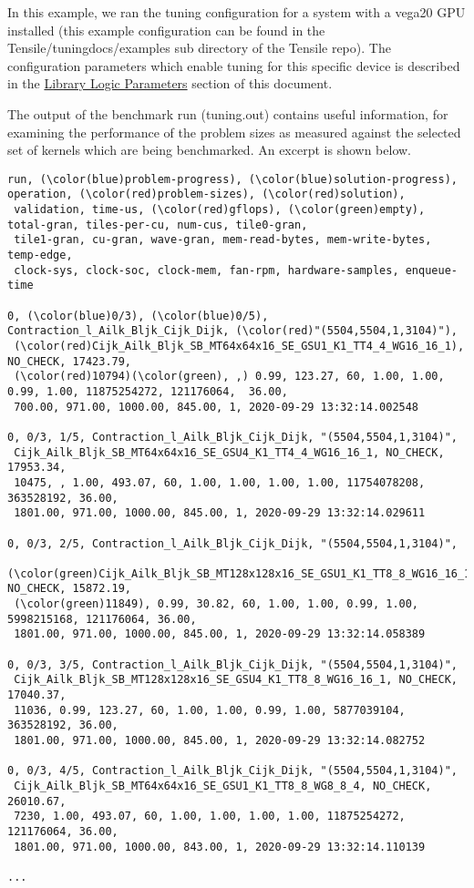 \documentclass[]{article}
\begin{document}
In this example, we ran the tuning configuration for a system with a vega20 GPU installed (this example configuration can be found in the Tensile/tuning\textunderscore docs/examples sub directory of the Tensile repo). The configuration parameters which enable tuning for this specific device is described in the \hyperref[sec:LibraryLogic]{Library  Logic Parameters} section of this document.

The output of the benchmark run (tuning.out) contains useful information, for examining the performance of the problem sizes as measured against the selected set of kernels which are being benchmarked. An excerpt is shown below.

\begin{Verbatim}[frame=single,commandchars=\\\(\)]
run, (\color(blue)problem-progress), (\color(blue)solution-progress), operation, (\color(red)problem-sizes), (\color(red)solution),
 validation, time-us, (\color(red)gflops), (\color(green)empty), total-gran, tiles-per-cu, num-cus, tile0-gran,
 tile1-gran, cu-gran, wave-gran, mem-read-bytes, mem-write-bytes, temp-edge,
 clock-sys, clock-soc, clock-mem, fan-rpm, hardware-samples, enqueue-time

0, (\color(blue)0/3), (\color(blue)0/5), Contraction_l_Ailk_Bljk_Cijk_Dijk, (\color(red)"(5504,5504,1,3104)"),
 (\color(red)Cijk_Ailk_Bljk_SB_MT64x64x16_SE_GSU1_K1_TT4_4_WG16_16_1), NO_CHECK, 17423.79,
 (\color(red)10794)(\color(green), ,) 0.99, 123.27, 60, 1.00, 1.00, 0.99, 1.00, 11875254272, 121176064,  36.00,
 700.00, 971.00, 1000.00, 845.00, 1, 2020-09-29 13:32:14.002548

0, 0/3, 1/5, Contraction_l_Ailk_Bljk_Cijk_Dijk, "(5504,5504,1,3104)",
 Cijk_Ailk_Bljk_SB_MT64x64x16_SE_GSU4_K1_TT4_4_WG16_16_1, NO_CHECK, 17953.34,
 10475, , 1.00, 493.07, 60, 1.00, 1.00, 1.00, 1.00, 11754078208, 363528192, 36.00,
 1801.00, 971.00, 1000.00, 845.00, 1, 2020-09-29 13:32:14.029611

0, 0/3, 2/5, Contraction_l_Ailk_Bljk_Cijk_Dijk, "(5504,5504,1,3104)",
 (\color(green)Cijk_Ailk_Bljk_SB_MT128x128x16_SE_GSU1_K1_TT8_8_WG16_16_1), NO_CHECK, 15872.19,
 (\color(green)11849), 0.99, 30.82, 60, 1.00, 1.00, 0.99, 1.00, 5998215168, 121176064, 36.00,
 1801.00, 971.00, 1000.00, 845.00, 1, 2020-09-29 13:32:14.058389

0, 0/3, 3/5, Contraction_l_Ailk_Bljk_Cijk_Dijk, "(5504,5504,1,3104)",
 Cijk_Ailk_Bljk_SB_MT128x128x16_SE_GSU4_K1_TT8_8_WG16_16_1, NO_CHECK, 17040.37,
 11036, 0.99, 123.27, 60, 1.00, 1.00, 0.99, 1.00, 5877039104, 363528192, 36.00,
 1801.00, 971.00, 1000.00, 845.00, 1, 2020-09-29 13:32:14.082752

0, 0/3, 4/5, Contraction_l_Ailk_Bljk_Cijk_Dijk, "(5504,5504,1,3104)",
 Cijk_Ailk_Bljk_SB_MT64x64x16_SE_GSU1_K1_TT8_8_WG8_8_4, NO_CHECK, 26010.67,
 7230, 1.00, 493.07, 60, 1.00, 1.00, 1.00, 1.00, 11875254272, 121176064, 36.00,
 1801.00, 971.00, 1000.00, 843.00, 1, 2020-09-29 13:32:14.110139

...
\end{Verbatim}
\end{document}
